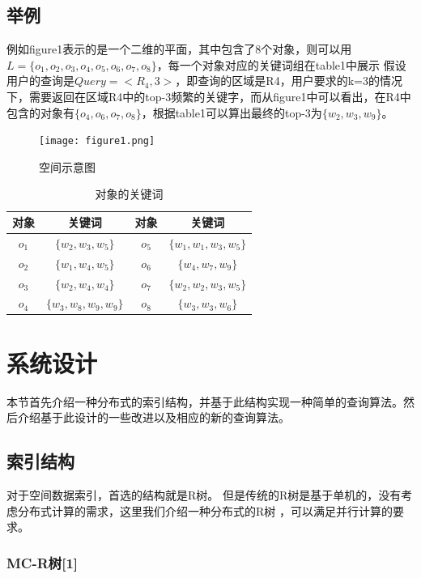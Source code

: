 \documentclass{elegantpaper}
\begin{document}
\subsection{举例}

例如figure1表示的是一个二维的平面，其中包含了8个对象，则可以用$L=\{o_1,o_2,o_3,o_4,o_5,o_6,o_7,o_8\}$，每一个对象对应的关键词组在table1中展示
假设用户的查询是$Query=<R_4,3>$，即查询的区域是R4，用户要求的k=3的情况下，需要返回在区域R4中的top-3频繁的关键字，而从figure1中可以看出，在R4中包含的对象有$\{o_4,o_6,o_7,o_8\}$，根据table1可以算出最终的top-3为$\{w_2,w_3,w_9\}$。

\begin{figure}[!ht]
	\centering
	\texttt{[image: figure1.png]}
	\caption{空间示意图\label{fig:figure1}}
\end{figure}

\begin{table}[!htbp]
    \centering
    \caption{对象的关键词}
      \begin{tabular}{cccc}
      对象&关键词&对象&关键词\\
      \hline
      $o_1$   & $\{w_2,w_3,w_5\}$ & $o_5$&$\{w_1,w_1,w_3,w_5\}$\\
      $o_2$   & $\{w_1,w_4,w_5\}$ & $o_6$&$\{w_4,w_7,w_9\}$\\
      $o_3$   & $\{w_2,w_4,w_4\}$ & $o_7$&$\{w_2,w_2,w_3,w_5\}$\\
      $o_4$   & $\{w_3,w_8,w_9,w_9\}$ & $o_8$&$\{w_3,w_3,w_6\}$\\
      \end{tabular}
\end{table}

\section{系统设计}

本节首先介绍一种分布式的索引结构，并基于此结构实现一种简单的查询算法。然后介绍基于此设计的一些改进以及相应的新的查询算法。

\subsection{索引结构}

对于空间数据索引，首选的结构就是R树。
但是传统的R树是基于单机的，没有考虑分布式计算的需求，这里我们介绍一种分布式的R树 ，可以满足并行计算的要求。

\subsubsection{MC-R树[1]}
\end{document}
